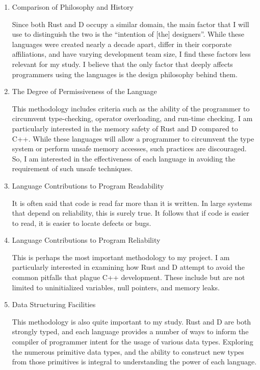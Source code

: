 \documentclass[finalcopy]{srpaper}
\begin{document}
\begin{enumerate}
\item Comparison of Philosophy and History

Since both Rust and D occupy a similar domain, the main factor that I will use
to distinguish the two is the ``intention of [the] designers''. While these
languages were created nearly a decade apart, differ in their corporate
affiliations, and have varying development team size, I find these factors less
relevant for my study. I believe that the only factor that deeply affects
programmers using the languages is the design philosophy behind them.

\item The Degree of Permissiveness of the Language

This methodology includes criteria such as the ability of the programmer to
circumvent type-checking, operator overloading, and run-time checking. I am
particularly interested in the memory safety of Rust and D compared to C++.
While these languages will allow a programmer to circumvent the type system or
perform unsafe memory accesses, such practices are discouraged. So, I am
interested in the effectiveness of each language in avoiding the requirement of
such unsafe techniques.

\item Language Contributions to Program Readability

It is often said that code is read far more than it is written. In large
systems that depend on reliability, this is surely true. It follows that if
code is easier to read, it is easier to locate defects or bugs.

\item Language Contributions to Program Reliability

This is perhaps the most important methodology to my project. I am particularly
interested in examining how Rust and D attempt to avoid the common pitfalls
that plague C++ development. These include but are not limited to uninitialized
variables, null pointers, and memory leaks.

\item Data Structuring Facilities

This methodology is also quite important to my study. Rust and D are both
strongly typed, and each language provides a number of ways to inform the
compiler of programmer intent for the usage of various data types. Exploring
the numerous primitive data types, and the ability to construct new types from
those primitives is integral to understanding the power of each language.


\end{enumerate}
\end{document}
